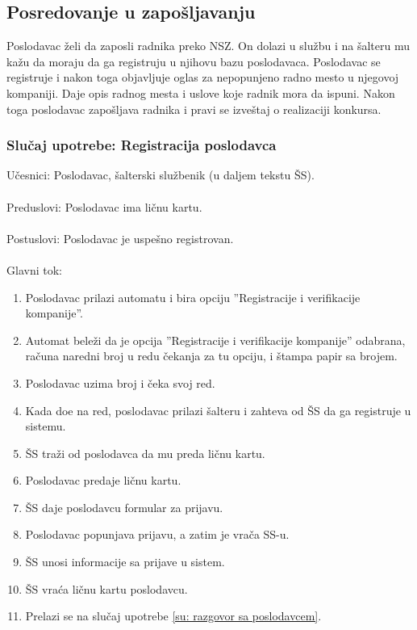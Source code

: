 \subsection{Posredovanje u zapo\v sljavanju}

Poslodavac \v zeli da zaposli radnika preko NSZ. On dolazi u slu\v zbu i na \v salteru mu ka\v zu da moraju da ga registruju u njihovu bazu poslodavaca. Poslodavac se registruje i nakon toga objavljuje oglas za nepopunjeno radno mesto u njegovoj kompaniji. Daje opis radnog mesta i uslove koje radnik mora da ispuni. Nakon toga poslodavac zapo\v sljava radnika i pravi se izve\v staj o realizaciji konkursa. 


\subsubsection{Slu\v caj upotrebe: Registracija poslodavca}

\noindent U\v cesnici: Poslodavac, \v salterski slu\v zbenik (u daljem tekstu \v SS).
\\
\\ Preduslovi: Poslodavac ima li\v cnu kartu.
\\
\\ Postuslovi: Poslodavac je uspe\v sno registrovan.
\\
\\ Glavni tok:
\begin{enumerate}
\item Poslodavac prilazi automatu i bira opciju ''Registracije i verifikacije kompanije''.
	\item Automat bele\v zi da je opcija ''Registracije i verifikacije kompanije'' odabrana, ra\v cuna naredni broj u redu \v cekanja za tu opciju, i \v stampa papir sa brojem.
	\item Poslodavac uzima broj i \v ceka svoj red.
	\item Kada do\dj e na red, poslodavac prilazi \v salteru i zahteva od \v SS da ga registruje u sistemu.
	\item \v SS tra\v zi od poslodavca da mu preda li\v cnu kartu.
	\item Poslodavac predaje li\v cnu kartu. 
	\item \v SS daje poslodavcu formular za prijavu.
    \item Poslodavac popunjava prijavu, a zatim je vra\v ca SS-u.
	\item \v SS unosi informacije sa prijave u sistem.
	\item \v SS vra\' ca li\v cnu kartu poslodavcu.
	\item Prelazi se na slu\v caj upotrebe \ref{su: razgovor sa poslodavcem}.
\end{enumerate}

